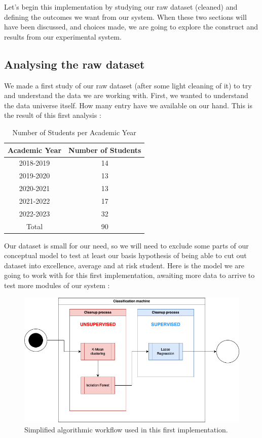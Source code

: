 \documentclass[../main.tex]{subfiles}
\begin{document}
Let's begin this implementation by studying our raw dataset (cleaned) and defining the outcomes we want from our system. When these two sections will have been discussed, and choices made, we are going to explore the construct and results from our experimental system.

\subsection{Analysing the raw dataset}
We made a first study of our raw dataset (after some light cleaning of it) to try and understand the data we are working with. First, we wanted to understand the data universe itself. How many entry have we available on our hand. This is the result of this first analysis :
\begin{table}[h]
  \centering
  \begin{tabular}{|c|c|}
    \hline
    Academic Year & Number of Students \\
    \hline
    2018-2019 & 14 \\
    2019-2020 & 13 \\
    2020-2021 & 13 \\
    2021-2022 & 17 \\
    2022-2023 & 32 \\
    \hline
    Total & 90 \\
    \hline
  \end{tabular}
  \caption{Number of Students per Academic Year}
  \label{tab:students_per_year}
\end{table}

Our dataset is small for our need, so we will need to exclude some parts of our conceptual model to test at least our basis hypothesis of being able to cut out dataset into excellence, average and at risk student.
Here is the model we are going to work with for this first implementation, awaiting more data to arrive to test more modules of our system : 

\begin{figure}[H]      
    \includegraphics[width=1\linewidth]{res//diagram/simplifiedmdl-Imp_mdl.drawio.png}
    \caption{Simplified algorithmic workflow used in this first implementation.}
    \label{fig:dataworkflow_simp} %
\end{figure}
\end{document}
